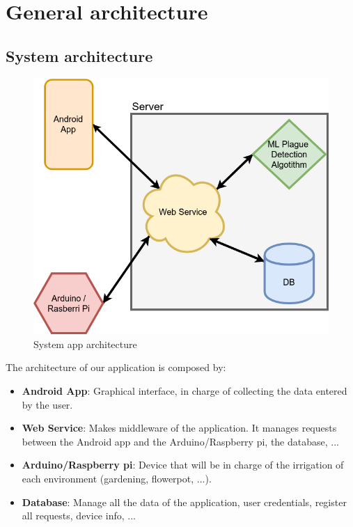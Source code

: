 \documentclass[11pt,a4paper]{article}
\begin{document}
\newpage

\section{General architecture}
\subsection{System architecture}
\begin{figure}[hbtp]
\centering
\includegraphics[scale=0.6]{figures/AppArchitecture.png}
\caption{System app architecture}
\end{figure}

The architecture of our application is composed by:
\begin{itemize}
\item \textbf{Android App}: Graphical interface, in charge of collecting the data entered by the user.
\item \textbf{Web Service}: Makes middleware of the application. It manages requests between the Android app and the Arduino/Raspberry pi, the database, ...
\item \textbf{Arduino/Raspberry pi}: Device that will be in charge of the irrigation of each environment (gardening, flowerpot, ...).
\item \textbf{Database}: Manage all the data of the application, user credentials, register all requests, device info, ...
\end{itemize}
\end{document}
